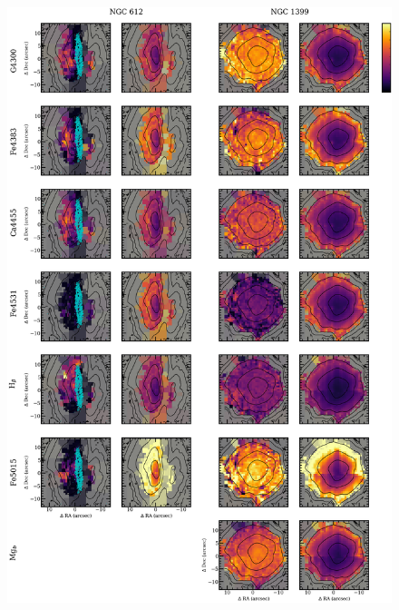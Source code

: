 		\begin{figure}
			\centering
			\includegraphics[height=0.94\textheight]{chapter4/vimos/abs3.png}
		\end{figure}

